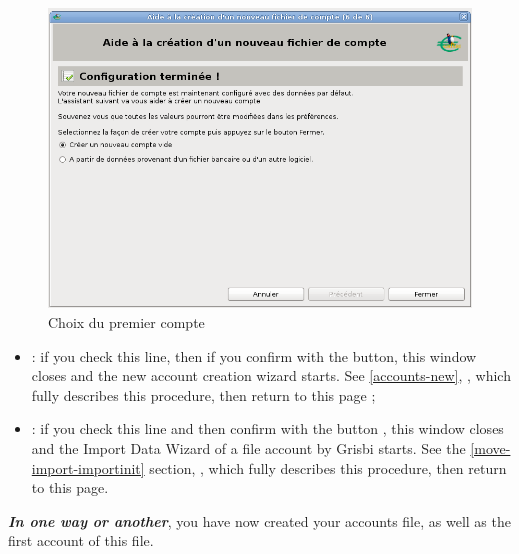 \begin{enumerate}
\ifIllustration
\begin{figure}[ht]
\begin{center}
\includegraphics[scale=0.5]{image/screenshot/start_account_choice}
\end{center}
\caption{Choix du premier compte}
\label{start-account-choice-img}
\end{figure}
\fi

\begin{itemize}
\item {} : if you check this line, then if you confirm with the  button, this window closes and the new account creation wizard starts. See  \vref{accounts-new}, ,  which fully describes this procedure, then return to this page ;

\item {} : if you check this line and then confirm with the  button ,  this window closes and the Import Data Wizard of a file account by Grisbi starts. See the \vref{move-import-importinit} section, , which fully describes this procedure, then return to this page.
\end{itemize}
\end{enumerate}

\label{start-newfile-end}

\textit{\textbf{In one way or another}}, you have now created your accounts file, as well as the first account of this file.


